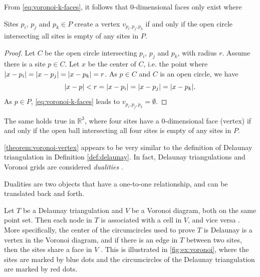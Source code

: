 From \autoref{eq:voronoi-k-faces}, it follows that 0-dimensional faces only exist where 
\begin{theorem}
\label{theorem:voronoi-vertex}
Sites $p_i$, $p_j$ and $p_k \in P$ create a vertex $v_{p_i, p_j, p_k}$ if and only if the open circle intersecting all sites is empty of any sites in $P$. 
\end{theorem}
\begin{proof}
Let $C$ be the open circle intersecting $p_i$, $p_j$ and $p_k$, with radius $r$. Assume there is a site $p \in C$. Let $x$ be the center of $C$, i.e. the point where $\lvert x - p_i\rvert = \lvert x - p_j\rvert = \lvert x - p_k\rvert = r$. As $p \in C$ and $C$ is an open circle, we have
\begin{equation*}
    \lvert x - p\rvert < r = \lvert x - p_i\rvert = \lvert x - p_j\rvert = \lvert x - p_k\rvert.
\end{equation*}
As $p \in P$, \autoref{eq:voronoi-k-faces} leads to $v_{p_i, p_j, p_k} = \emptyset$.
\end{proof}
The same holds true in $\mathbb{R}^3$, where four sites have a 0-dimensional face (vertex) if and only if the open ball intersecting all four sites is empty of any sites in $P$.

\autoref{theorem:voronoi-vertex} appears to be very similar to the definition of Delaunay triangulation in Definition \ref{def:delaunay}. In fact, Delaunay triangulations and Voronoi grids are considered \emph{dualities} \cite{UPR_chapter}.

\begin{definition}[Dualities]
Dualities are two objects that have a one-to-one relationship, and can be translated back and forth.
\end{definition}

Let $T$ be a Delaunay triangulation and $V$ be a Voronoi diagram, both on the same point set. Then each node in $T$ is associated with a cell in $V$, and vice versa \cite{UPR_chapter}. More specifically, the center of the circumcircles used to prove $T$ is Delaunay is a vertex in the Voronoi diagram, and if there is an edge in $T$ between two sites, then the sites share a face in $V$ \cite{UPR_chapter}. This is illustrated in \autoref{fig:ex:voronoi}, where the sites are marked by blue dots and the circumcircles of the Delaunay triangulation are marked by red dots.


